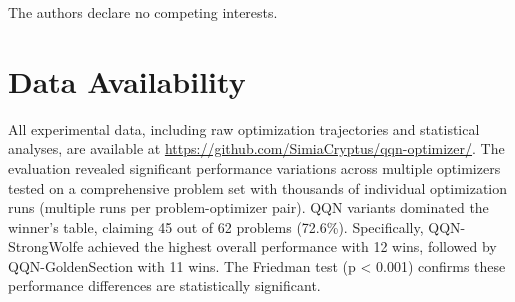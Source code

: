 The authors declare no competing interests.

\hypertarget{data-availability}{%
\section{Data Availability}\label{data-availability}}

All experimental data, including raw optimization trajectories and statistical analyses, are available at \url{https://github.com/SimiaCryptus/qqn-optimizer/}.
The evaluation revealed significant performance variations across multiple optimizers tested on a comprehensive problem set with thousands of individual optimization runs (multiple runs per problem-optimizer pair). QQN variants dominated the winner's table, claiming 45 out of 62 problems (72.6\%).
Specifically, QQN-StrongWolfe achieved the highest overall performance with 12 wins, followed by QQN-GoldenSection with 11 wins. The Friedman test (p \textless{} 0.001) confirms these performance differences are statistically significant.
